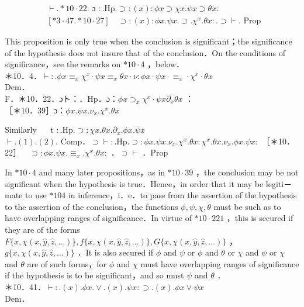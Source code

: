 \documentclass[10pt]{article}
\begin{document}
$$
\begin{aligned}
& \vdash . * 10 \cdot 22 . \text { ɔ }: . \mathrm{Hp} . \supset:(x): \phi x \supset \chi x . \psi x \supset \theta x: \\
& {[* 3 \cdot 47 . * 10 \cdot 27] \quad \supset:(x): \phi x . \psi x . \supset . \chi^{x} . \theta x: . \supset \vdash . \text { Prop }}
\end{aligned}
$$

This proposition is only true when the conclusion is significant；the significance of the hypothesis does not insure that of the conclusion．On the conditions of significance，see the remarks on $* 10 \cdot 4$ ，below．\\
＊10．4．$\vdash: . \phi x \equiv_{x} \chi^{x} \cdot \psi x \equiv_{x} \theta x \cdot \nu: \phi x \cdot \psi x \cdot \equiv_{x} \cdot \chi^{x} \cdot \theta x$\\
Dem．\\
F．＊10．22．ɔト：．Hp．ɔ：$\phi x \supset_{x} \chi^{x} \cdot \psi x \partial_{x} \theta x$ ：\\
［＊10．39］ɔ：$\phi x . \psi x . \nu_{x} . \chi^{x} . \theta x$

Similarly $\quad$ t $: . \mathrm{Hp} . \supset: \chi x . \theta x . \partial_{x} . \phi x . \psi x$\\
$\vdash .(1) .(2)$. Comp．$\supset \vdash: . \mathrm{Hp} . \supset: \phi x . \psi x . \nu_{x} . \chi^{x} . \theta x: \chi^{x} . \theta x . \nu_{x} . \phi x . \psi x:$ ［＊10．22］$\quad \supset: \phi x . \psi x . \equiv_{x} . \chi^{x} . \theta x:$ ．$\supset \vdash$ ．Prop

In $* 10 \cdot 4$ and many later propositions，as in $* 10 \cdot 39$ ，the conclusion may be not significant when the hypothesis is true．Hence，in order that it may be legiti－ mate to use $* 104$ in inference，i．e．to pass from the assertion of the hypothesis to the assertion of the conclusion，the functions $\phi, \psi, \chi, \theta$ must be such as to have overlapping ranges of significance．In virtue of $* 10 \cdot 221$ ，this is secured if they are of the forms $F\{x, \chi(x, \hat{y}, \hat{z}, \ldots)\}, f\{x, \chi(x, \hat{y}, \hat{z}, \ldots)\}, G\{x, \chi(x, \hat{y}, \hat{z}, \ldots)\}$ ， $g\{x, \chi(x, \hat{y}, \hat{z}, \ldots)\}$ ．It is also secured if $\phi$ and $\psi$ or $\phi$ and $\theta$ or $\chi$ and $\psi$ or $\chi$ and $\theta$ are of such forms，for $\phi$ and $\chi$ must have overlapping ranges of significance if the hypothesis is to be significant，and so must $\psi$ and $\theta$ ．\\
＊10．41．$\vdash: .(x) . \phi x . \vee .(x) . \psi x: \supset .(x) . \phi x \vee \psi x$\\
Dem．
\end{document}
